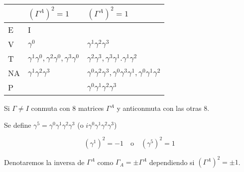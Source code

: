 \documentclass{report}
\begin{document}
\begin{center}
    \begin{tabular}{| l | l | l |}
    \hline
     & $(\Gamma^{A})^2 = 1$ & $(\Gamma^A)^2=1$  \\ \hline
    E & I &    \\ \hline
    V & $\gamma^0$ & $\gamma^{1} \gamma^2 \gamma^3$  \\ \hline
    T & $\gamma^1 \gamma^0, \gamma^2 \gamma^0, \gamma^3 \gamma^0$ & $\gamma^2 \gamma^3 , \gamma^3 \gamma^1 . \gamma^1 \gamma^2$ \\ \hline
    NA & $\gamma^1 \gamma^2 \gamma^3$ & $\gamma^0 \gamma^2 \gamma^3 , \gamma^0 \gamma^3 \gamma^1 , \gamma^0 \gamma^1 \gamma^2$ \\ \hline
P & &$\gamma^0 \gamma^1 \gamma^2 \gamma^3$
\\ \hline
    \end{tabular}
\end{center}

Si $\Gamma  \neq I$ conmuta con 8 matrices $\Gamma^A$ y anticonmuta con las otras 8.

Se define $\gamma^5 = \gamma^0 \gamma^1 \gamma^2 \gamma^3$ (o $i \gamma^0 \gamma^1 \gamma^2 \gamma^3 $)

\[(\gamma^1)^2 = -1 \quad \text{o} \quad (\gamma^5)^2 = 1\]

Denotaremos la inversa de $\Gamma^A$ como $\Gamma_A = \pm \Gamma^A$ dependiendo si $(\Gamma ^A)^2 =\pm 1$.
\end{document}
